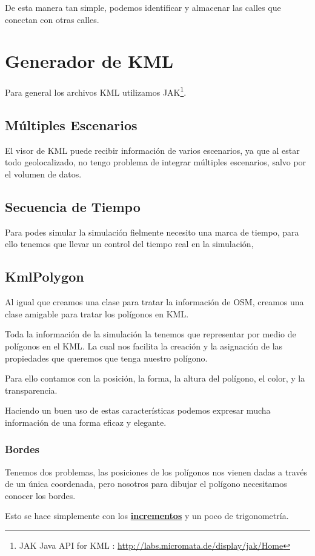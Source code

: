 De esta manera tan simple, podemos identificar y almacenar las calles que
conectan con otras calles.

\section*{Generador de KML}
Para general los archivos KML utilizamos
JAK\footnote{JAK Java API for KML :
\url{http://labs.micromata.de/display/jak/Home}}.
\subsection*{Múltiples Escenarios}
El visor de KML puede recibir información de varios escenarios, ya que al estar
todo geolocalizado, no tengo problema de integrar múltiples
escenarios, salvo por el volumen de datos.
\subsection*{Secuencia de Tiempo}
Para podes simular la simulación fielmente necesito una marca de tiempo, para
ello tenemos que llevar un control del tiempo real en la simulación, 
\subsection*{KmlPolygon}
Al igual que creamos una clase para tratar la información de OSM, creamos una
clase amigable para tratar los polígonos en KML.

Toda la información de la simulación la tenemos que representar por medio de
polígonos en el KML. La cual nos facilita la creación y la asignación de las
propiedades que queremos que tenga nuestro polígono.

Para ello contamos con la posición, la forma, la altura del polígono, el color,
y la transparencia.

Haciendo un buen uso de estas características podemos expresar mucha
información de una forma eficaz y elegante.
\subsubsection*{Bordes}
Tenemos dos problemas, las posiciones de los polígonos nos vienen dadas a
través de un única coordenada, pero nosotros para dibujar el polígono
necesitamos conocer los bordes.

Esto se hace simplemente con los \hyperref[incrementos]{\bf incrementos} y un
poco de trigonometría.

